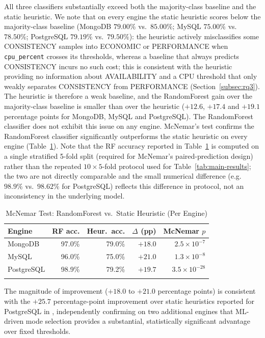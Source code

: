 \documentclass[iicol,pdflatex,sn-mathphys-num]{sn-jnl}
\theoremstyle{thmstyleone}
\theoremstyle{thmstylethree}
\begin{document}
All three classifiers substantially exceed both the majority-class
baseline and the static heuristic. We note that on every engine the
static heuristic scores below the majority-class baseline
(MongoDB $79.00\%$ vs.\ $85.00\%$; MySQL $75.00\%$ vs.\ $78.50\%$;
PostgreSQL $79.19\%$ vs.\ $79.50\%$): the heuristic actively
misclassifies some CONSISTENCY samples into ECONOMIC or PERFORMANCE
when \texttt{cpu\_percent} crosses its thresholds, whereas a baseline
that always predicts CONSISTENCY incurs no such cost; this is
consistent with the heuristic providing no information about
AVAILABILITY and a CPU threshold that only weakly separates
CONSISTENCY from PERFORMANCE (Section~\ref{subsec:rq3}). The heuristic
is therefore a weak baseline, and the RandomForest gain over the
majority-class baseline is smaller than over the heuristic
($+12.6$, $+17.4$ and $+19.1$ percentage points for MongoDB, MySQL and
PostgreSQL). The RandomForest classifier
does not exhibit this issue on any engine. McNemar's test confirms the
RandomForest classifier significantly outperforms the static
heuristic on every engine (Table~\ref{tab:mcnemar}). Note that the RF
accuracy reported in Table~\ref{tab:mcnemar} is computed on a single
stratified 5-fold split (required for McNemar's paired-prediction
design) rather than the repeated $10\times5$-fold protocol used for
Table~\ref{tab:main-results}; the two are not directly comparable and
the small numerical difference (e.g.\ $98.9\%$ vs.\ $98.62\%$ for
PostgreSQL) reflects this difference in protocol, not an
inconsistency in the underlying model.

\begin{table}[h]
\caption{McNemar Test: RandomForest vs.\ Static Heuristic (Per Engine)}\label{tab:mcnemar}
\begin{tabular}{@{}lrrrr@{}}
\toprule
Engine & RF acc. & Heur.\ acc. & $\Delta$ (pp) & McNemar $p$ \\
\midrule
MongoDB     & 97.0\% & 79.0\% & $+18.0$ & $2.5\times10^{-7}$ \\
MySQL       & 96.0\% & 75.0\% & $+21.0$ & $1.3\times10^{-8}$ \\
PostgreSQL  & 98.9\% & 79.2\% & $+19.7$ & $3.5\times10^{-28}$ \\
\botrule
\end{tabular}
\end{table}

The magnitude of improvement ($+18.0$ to $+21.0$ percentage points) is
consistent with the $+25.7$ percentage-point improvement over static
heuristics reported for PostgreSQL in \cite{iaha2026}, independently
confirming on two additional engines that ML-driven mode selection
provides a substantial, statistically significant advantage over fixed
thresholds.
\end{document}
